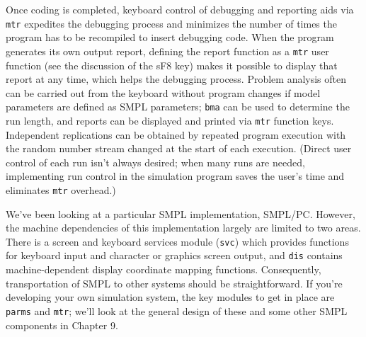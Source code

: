 Once coding is completed, keyboard control of debugging and reporting
aids via \texttt{mtr} expedites the debugging process and minimizes the number of
times the program has to be recompiled to insert debugging code. When the
program generates its own output report, defining the report function as a \texttt{mtr}
user function (see the discussion of the sF8 key) makes it possible to display
that report at any time, which helps the debugging process. Problem analysis
often can be carried out from the keyboard without program changes if
model parameters are defined as SMPL parameters; \texttt{bma} can be used to
determine the run length, and reports can be displayed and printed via \texttt{mtr}
function keys. Independent replications can be obtained by repeated program
execution with the random number stream changed at the start of each
execution. (Direct user control of each run isn't always desired; when many
runs are needed, implementing run control in the simulation program saves
the user's time and eliminates \texttt{mtr} overhead.)

We've been looking at a particular SMPL implementation, SMPL/PC.
However, the machine dependencies of this implementation largely are
limited to two areas. There is a screen and keyboard services module (\texttt{svc})
which provides functions for keyboard input and character or graphics screen
output, and \texttt{dis} contains machine-dependent display coordinate mapping
functions. Consequently, transportation of SMPL to other systems should be
straightforward. If you're developing your own simulation system, the key
modules to get in place are \texttt{parms} and \texttt{mtr}; we'll look at the general design of
these and some other SMPL components in Chapter 9.
